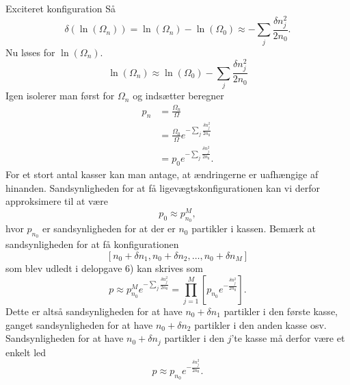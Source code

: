 \begin{opgave}{Exciteret konfiguration}
    Så
    \[ \delta\left(\ln\left(\Omega_n\right)\right)=\ln(\Omega_n)-\ln(\Omega_0)\approx -\sum_j\frac{\delta n_j^2}{2n_0}. \]
    Nu løses for $\ln(\Omega_n)$.
    \[ \ln(\Omega_n)\approx \ln(\Omega_0)-\sum_j\frac{\delta n_j^2}{2n_0} \]
    \opg Igen isolerer man først for $\Omega_n$ og indsætter beregner
    \begin{align*}
        p_n&=\frac{\Omega_n}{\Omega}\\
        &=\frac{\Omega_0}{\Omega}e^{-\sum_j\frac{\delta n^2_j}{2n_0}}\\
        &=p_0e^{-\sum_j\frac{\delta n^2_j}{2n_0}}.
    \end{align*}
    \opg For et stort antal kasser kan man antage, at ændringerne er uafhængige af hinanden. Sandsynligheden for at få ligevægtskonfigurationen kan vi derfor approksimere til at være
    \[ p_0\approx p_{n_0}^M, \]
    hvor $p_{n_0}$ er sandsynligheden for at der er $n_0$ partikler i kassen. Bemærk at sandsynligheden for at få konfigurationen
    \[ [n_0+\delta n_1, n_0+\delta n_2,\dots,n_0+\delta n_M] \]
    som blev udledt i delopgave 6) kan skrives som
    \[ p\approx p_{n_0}^Me^{-\sum_j\frac{\delta n^2_j}{2n_0}}=\prod_{j=1}^M \left[p_{n_0}e^{-\frac{\delta n^2_j}{2n_0}}\right]. \]
    Dette er altså sandsynligheden for at have $n_0+\delta n_1$ partikler i den første kasse, ganget sandsynligheden for at have $n_0+\delta n_2$ partikler i den anden kasse osv. Sandsynligheden for at have $n_0+\delta n_j$ partikler i den $j$'te kasse må derfor være et enkelt led
    \[ p\approx p_{n_0}e^{-\frac{\delta n_j^2}{2n_0}}. \]
\end{opgave}

